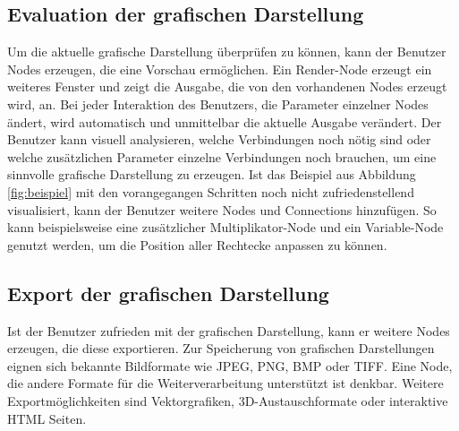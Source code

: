 \documentclass[a4paper, 
               12pt,
               DIV=calc,
               version=first,
               pdftex,
               headsepline,
               footsepline,
               bibtotocnumbered,
               liststotocnumbered]{scrreprt}
\begin{document}
\subsection{Evaluation der grafischen Darstellung}
Um die aktuelle grafische Darstellung überprüfen zu können, kann der Benutzer Nodes
erzeugen, die eine Vorschau ermöglichen. Ein Render-Node erzeugt ein weiteres
Fenster und zeigt die Ausgabe, die von den vorhandenen Nodes erzeugt wird, an.
Bei jeder Interaktion des Benutzers, die Parameter einzelner Nodes ändert,
wird automatisch und unmittelbar die aktuelle Ausgabe verändert.
Der Benutzer kann visuell analysieren, welche Verbindungen noch nötig sind
oder welche zusätzlichen Parameter einzelne Verbindungen noch brauchen, um eine sinnvolle grafische 
Darstellung zu erzeugen. Ist das Beispiel aus Abbildung \ref{fig:beispiel} mit den vorangegangen Schritten noch nicht
zufriedenstellend visualisiert, kann der Benutzer weitere Nodes und Connections
hinzufügen. So kann beispielsweise eine zusätzlicher Multiplikator-Node und ein
Variable-Node genutzt werden, um die Position aller Rechtecke anpassen zu können.
\subsection{Export der grafischen Darstellung}
Ist der Benutzer zufrieden mit der grafischen Darstellung, kann er weitere Nodes
erzeugen, die diese exportieren. Zur Speicherung von grafischen Darstellungen
eignen sich bekannte Bildformate wie JPEG, PNG, BMP oder TIFF. Eine Node, die andere Formate
für die Weiterverarbeitung unterstützt ist denkbar. Weitere Exportmöglichkeiten
sind Vektorgrafiken, 3D-Austauschformate oder interaktive HTML Seiten.
\end{document}
